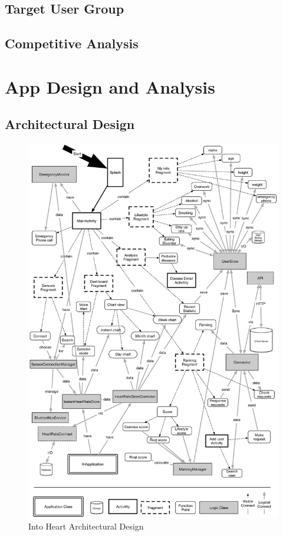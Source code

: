 \documentclass[10pt,a4paper,final]{scrartcl}
\begin{document}
\subsection{Target User Group}
\subsection{Competitive Analysis}

\section{App Design and Analysis}
\subsection{Architectural Design}
\begin{figure}[H]
\centering
\includegraphics[width=5.3in]{img/arch.eps}
\caption{Into Heart Architectural Design}
\end{figure}
\end{document}
